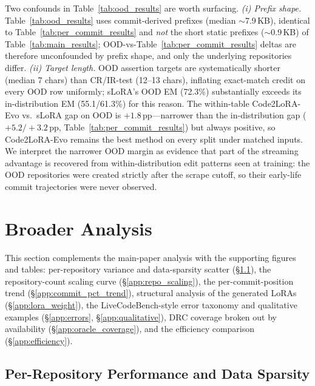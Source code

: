 \documentclass[11pt]{article}
\newcommand{\codelora}{Code2LoRA\xspace}
\newcommand{\codeloraevo}{\codelora-Evo\xspace}
\begin{document}
Two confounds in Table~\ref{tab:ood_results} are worth surfacing.
\emph{(i) Prefix shape.}
Table~\ref{tab:ood_results} uses commit-derived prefixes (median ${\sim}$7.9\,KB), identical to Table~\ref{tab:per_commit_results} and \emph{not} the short static prefixes (${\sim}$0.9\,KB) of Table~\ref{tab:main_results}; OOD-vs-Table~\ref{tab:per_commit_results} deltas are therefore unconfounded by prefix shape, and only the underlying repositories differ.
\emph{(ii) Target length.}
OOD assertion targets are systematically shorter (median 7 chars) than CR/IR-test (12--13 chars), inflating exact-match credit on every OOD row uniformly; sLoRA's OOD EM (72.3\%) substantially exceeds its in-distribution EM (55.1/61.3\%) for this reason.
The within-table \codeloraevo{} vs.\ sLoRA gap on OOD is $+1.8$\,pp---narrower than the in-distribution gap ($+5.2/+3.2$\,pp, Table~\ref{tab:per_commit_results}) but always positive, so \codeloraevo{} remains the best method on every split under matched inputs.
We interpret the narrower OOD margin as evidence that part of the streaming advantage is recovered from within-distribution edit patterns seen at training: the OOD repositories were created strictly after the scrape cutoff, so their early-life commit trajectories were never observed.

\section{Broader Analysis}
\label{app:analysis}

This section complements the main-paper analysis with the supporting figures and tables:
per-repository variance and data-sparsity scatter (\S\ref{app:per_repo_variance}),
the repository-count scaling curve (\S\ref{app:repo_scaling}),
the per-commit-position trend (\S\ref{app:commit_pct_trend}),
structural analysis of the generated LoRAs (\S\ref{app:lora_weight}),
the LiveCodeBench-style error taxonomy and qualitative examples (\S\ref{app:errors}, \S\ref{app:qualitative}),
DRC coverage broken out by availability (\S\ref{app:oracle_coverage}),
and the efficiency comparison (\S\ref{app:efficiency}).

\subsection{Per-Repository Performance and Data Sparsity}
\label{app:per_repo_variance}
\end{document}
